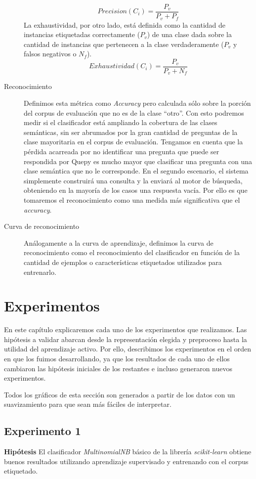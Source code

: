 \begin{description}
    $$Precision(C_i) = \frac{P_v}{P_v + P_f}$$
    La exhaustividad, por otro lado, está definida como la cantidad de instancias etiquetadas correctamente ($P_v$) de una clase dada sobre la cantidad de instancias que pertenecen a la clase verdaderamente ($P_v$ y falsos negativos o $N_f$).
    $$Exhaustividad(C_i) = \frac{P_v}{P_v + N_f}$$
    \item[Reconocimiento] Definimos esta métrica como \textit{Accuracy} pero calculada sólo sobre la porción del corpus de evaluación que no es de la clase ``otro''. Con esto podremos medir si el clasificador está ampliando la cobertura de las clases semánticas, sin ser abrumados por la gran cantidad de preguntas de la clase mayoritaria en el corpus de evaluación. Tengamos en cuenta que la pérdida acarreada por no identificar una pregunta que puede ser respondida por Quepy es mucho mayor que clasificar una pregunta con una clase semántica que no le corresponde. En el segundo escenario, el sistema simplemente construirá una consulta y la enviará al motor de búsqueda, obteniendo en la mayoría de los casos una respuesta vacía. Por ello es que tomaremos el reconocimiento como una medida más significativa que el \textit{accuracy}.
    \item[Curva de reconocimiento] Análogamente a la curva de aprendizaje, definimos la curva de reconocimiento como el reconocimiento del clasificador en función de la cantidad de ejemplos o características etiquetados utilizados para entrenarlo.
\end{description}

\chapter{Experimentos}

En este capítulo explicaremos cada uno de los experimentos que realizamos. Las hipótesis a validar abarcan desde la representación elegida y preproceso hasta la utilidad del aprendizaje activo. Por ello, describimos los experimentos en el orden en que los fuimos desarrollando, ya que los resultados de cada uno de ellos cambiaron las hipótesis iniciales de los restantes e incluso generaron nuevos experimentos.

Todos los gráficos de esta sección son generados a partir de los datos con un suavizamiento para que sean más fáciles de interpretar.

\section{Experimento 1}
\vspace{3 mm}
\textbf{Hipótesis} El clasificador \textit{MultinomialNB} básico de la librería \textit{scikit-learn} obtiene buenos resultados utilizando aprendizaje supervisado y entrenando con el corpus etiquetado.
\vspace{3 mm}

